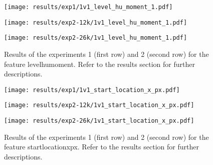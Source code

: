 \begin{figure}[h!]
	\centering
	\begin{minipage}{0.4\linewidth}
		\texttt{[image: results/exp1/1v1\_level\_hu\_moment\_1.pdf]}
	\end{minipage}
	
	\begin{minipage}{0.4\linewidth}
		\texttt{[image: results/exp2-12k/1v1\_level\_hu\_moment\_1.pdf]}
	\end{minipage}
	\begin{minipage}{0.4\linewidth}
		\texttt{[image: results/exp2-26k/1v1\_level\_hu\_moment\_1.pdf]}
	\end{minipage}
	
	\caption[ Results: Feature level\textunderscore hu\textunderscore moment]{ Results of the experiments 1 (first row) and 2 (second row) for the feature level\textunderscore hu\textunderscore moment. Refer to the results section for further descriptions. }
	\label{fig:appendix_level_hu_moment_1}
\end{figure}

\begin{figure}[h!]
	\centering
	\begin{minipage}{0.4\linewidth}
		\texttt{[image: results/exp1/1v1\_start\_location\_x\_px.pdf]}
	\end{minipage}
	
	\begin{minipage}{0.4\linewidth}
		\texttt{[image: results/exp2-12k/1v1\_start\_location\_x\_px.pdf]}
	\end{minipage}
	\begin{minipage}{0.4\linewidth}
		\texttt{[image: results/exp2-26k/1v1\_start\_location\_x\_px.pdf]}
	\end{minipage}
	
	\caption[ Results: Feature start\textunderscore location\textunderscore x\textunderscore px]{ Results of the experiments 1 (first row) and 2 (second row) for the feature start\textunderscore location\textunderscore x\textunderscore px. Refer to the results section for further descriptions. }
	\label{fig:appendix_start_location_x_px}
\end{figure}
\newpage 


